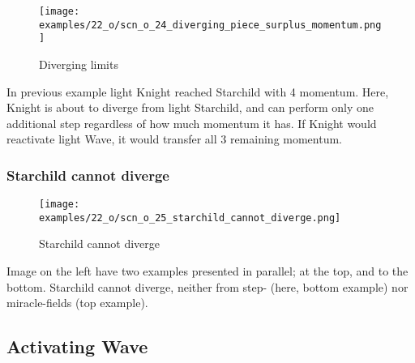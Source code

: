 \vspace*{0.4\baselineskip}
\noindent
\begin{wrapfigure}[9]{l}{0.4\textwidth}
\centering
\texttt{[image: examples/22\_o/scn\_o\_24\_diverging\_piece\_surplus\_momentum.png]}
\vspace*{-0.4\baselineskip}
\caption{Diverging limits}
\label{fig:scn_o_24_diverging_piece_surplus_momentum}
\end{wrapfigure}
In previous example light Knight reached Starchild with 4 momentum. Here, Knight
is about to diverge from light Starchild, and can perform only one additional step
regardless of how much momentum it has. If Knight would reactivate light Wave, it
would transfer all 3 remaining momentum.

\vspace*{-0.9\baselineskip}
\subsubsection*{Starchild cannot diverge}
\label{sec:One/Starchild/Divergence/Starchild cannot diverge}

\vspace*{-0.9\baselineskip}
\noindent
\begin{wrapfigure}[7]{l}{0.4\textwidth}
\centering
\texttt{[image: examples/22\_o/scn\_o\_25\_starchild\_cannot\_diverge.png]}
\vspace*{-0.4\baselineskip}
\caption{Starchild cannot diverge}
\label{fig:scn_o_25_starchild_cannot_diverge}
\end{wrapfigure}
Image on the left have two examples presented in parallel; at the top, and to the
bottom. \newline
\indent
Starchild cannot diverge, neither from step- (here, bottom example) nor miracle-fields
(top example).

\clearpage %

\subsection*{Activating Wave}
\label{sec:One/Starchild/Activating Wave}

